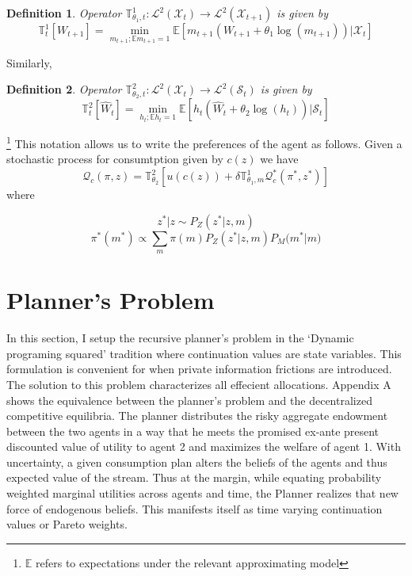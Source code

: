 \documentclass[12pt]{article}
\newtheorem{definition}{Definition}
\begin{document}
\begin{definition}	
Operator $\mathbb{T}^1_{\theta_1,t} : \mathcal{L}^2(\mathcal{X}_{t}) \to \mathcal{L}^2(\mathcal{X}_{t+1}) $ is given by
\[\mathbb{T}^1_t[W_{t+1}] = \min_{m_{t+1}; \mathbb{E}m_{t+1}=1} \mathbb{E}\left[m_{t+1}\left( W_{t+1} +\theta_1 \log(m_{t+1})\right)| \mathcal{X}_t\right] \]
\end{definition}
\noindent Similarly, 
\begin{definition}
Operator $\mathbb{T}^2_{\theta_2,t} : \mathcal{L}^2(\mathcal{X}_{t}) \to \mathcal{L}^2(\mathcal{S}_t) $ is given by
\[\mathbb{T}^2_t[\hat{W}_t] = \min_{h_{t}; \mathbb{E}h_t=1} \mathbb{E}\left[h_{t}\left( \hat{W}_t +\theta_2 \log(h_{t})\right)| \mathcal{S}_t\right] \]
\end{definition}
\footnote{$\mathbb{E}$ refers to expectations under the relevant approximating model}
This notation allows us to write the preferences of the agent as follows. Given a stochastic process for consumtption given by $c(z)$ we have 
\[\mathcal{Q}_c(\pi,z)=\mathbb{T}^2_{\theta_2}\left[u(c(z))+\delta\mathbb{T}^1_{\theta_1,m} \mathcal{Q}_c^*(\pi^*,z^*)\right]\]
where

\[z^*|z \sim P_Z(z^*|z,m)\]
\[\pi^{*}(m^*)\propto \sum_{m}{\pi(m) P_Z(z^*|z,m)P_M(m^*}|m)\]





\section{Planner's Problem}
In this section, I setup the recursive planner's problem in the `Dynamic programing squared' tradition where continuation values are state variables. This formulation is convenient for when private information frictions are introduced. The solution to this problem characterizes all effecient allocations. Appendix A shows the equivalence between the planner's problem and the decentralized competitive equilibria. The planner distributes the risky aggregate endowment between the two agents in a way that he meets the promised ex-ante present discounted value of utility to agent 2 and maximizes the welfare of agent 1. With uncertainty, a given consumption plan alters the beliefs of the agents and thus expected value of the stream. Thus at the margin, while equating  probability weighted marginal utilities across agents and time, the Planner realizes that new force of endogenous beliefs. This manifests itself as time varying continuation values or Pareto weights.
\end{document}
